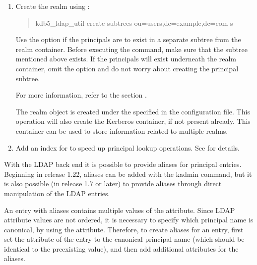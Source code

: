 \documentclass[letterpaper,10pt,english]{sphinxmanual}
\begin{document}
\begin{enumerate}
\item {} 
\sphinxAtStartPar
Create the realm using {\hyperref[\detokenize{admin/admin_commands/kdb5_ldap_util:kdb5-ldap-util-8}]{}}:
\begin{quote}

\sphinxAtStartPar
kdb5\_ldap\_util create \sphinxhyphen{}subtrees ou=users,dc=example,dc=com \sphinxhyphen{}s
\end{quote}

\sphinxAtStartPar
Use the  option if the principals are to exist in a
separate subtree from the realm container.  Before executing the
command, make sure that the subtree mentioned above
 exists.  If the principals will
exist underneath the realm container, omit the  option
and do not worry about creating the principal subtree.

\sphinxAtStartPar
For more information, refer to the section {\hyperref[\detokenize{admin/database:ops-on-ldap}]{}}.

\sphinxAtStartPar
The realm object is created under the
 specified in the configuration
file.  This operation will also create the Kerberos container, if
not present already.  This container can be used to store
information related to multiple realms.

\item {} 
\sphinxAtStartPar
Add an  index for  to speed up principal
lookup operations.  See
 for
details.

\end{enumerate}

\sphinxAtStartPar
With the LDAP back end it is possible to provide aliases for principal
entries.  Beginning in release 1.22, aliases can be added with the
kadmin  command, but it is also possible (in release 1.7
or later) to provide aliases through direct manipulation of the LDAP
entries.

\sphinxAtStartPar
An entry with aliases contains multiple values of the
 attribute.  Since LDAP attribute values are not
ordered, it is necessary to specify which principal name is canonical,
by using the  attribute.  Therefore, to create
aliases for an entry, first set the  attribute of
the entry to the canonical principal name (which should be identical
to the pre\sphinxhyphen{}existing  value), and then add additional
 attributes for the aliases.
\end{document}
